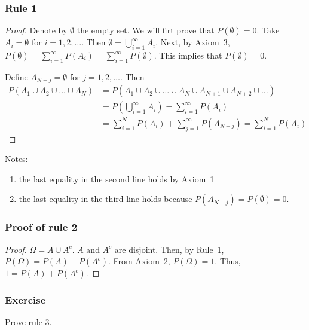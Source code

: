 \begin{frame}
    \frametitle{Rule 1}

	\footnotesize
	\begin{proof}
		Denote by $\emptyset$ the empty set. We will firt prove that
        $P(\emptyset)=0$. Take $A_i=\emptyset$ for $i=1, 2, \ldots$. Then
        $\emptyset=\bigcup_{i=1}^\infty A_i$. Next, by Axiom~3, $P(\emptyset)=\sum_{i=1}^\infty P(A_i)=\sum_{i=1}^\infty P(\emptyset)$. This implies that $P(\emptyset)=0$.

		Define $A_{N+j}=\emptyset$ for $j=1,2,\ldots$. Then
		\footnotesize
		\begin{align*}
            P(A_1\cup A_2\cup\ldots\cup A_N)&=P(A_1\cup A_2\cup\ldots\cup A_N\cup A_{N+1}\cup A_{N+2}\cup\ldots)\\
										    &=P(\bigcup_{i=1}^\infty A_i)=\sum_{i=1}^\infty P(A_i)\\
                                            &=\sum_{i=1}^N P(A_i)+\sum_{j=1}^\infty P(A_{N+j})=\sum_{i=1}^N P(A_i)
		\end{align*}
		\normalsize

	\end{proof}

	Notes:
	\begin{enumerate}
		\item the last equality in the second line holds by Axiom~1
		\item the last equality in the third line holds because $P(A_{N+j})=P(\emptyset)=0$.
	\end{enumerate}
    \normalsize

\end{frame}

\begin{frame}
    \frametitle{Proof of rule 2}

	\begin{proof}

		$\Omega=A\cup A^c$. $A$ and $A^c$ are disjoint. Then, by Rule~1, $P(\Omega)=P(A)+P(A^c)$. From Axiom~2, $P(\Omega)=1$. Thus, $1=P(A)+P(A^c)$.

	\end{proof}

\end{frame}

\begin{frame}
    \frametitle{Exercise}

    Prove rule 3.

\end{frame}

